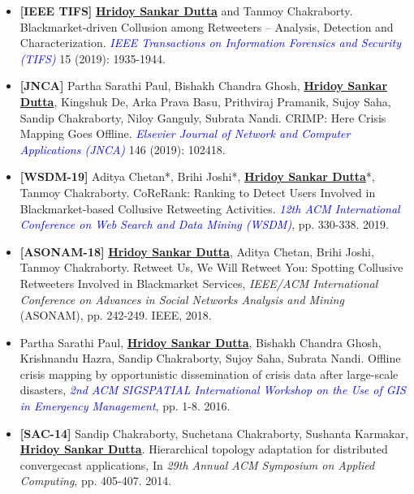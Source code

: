 \documentclass[margin, centered,lmodern]{res}
\begin{document}
\begin{resume}
\begin{itemize}[leftmargin=*]
\item  \textbf{[IEEE TIFS]} \textbf{\underline{Hridoy Sankar Dutta}} and Tanmoy Chakraborty. Blackmarket-driven Collusion among Retweeters – Analysis, Detection and Characterization. \textit{\textcolor{blue}{IEEE Transactions on Information Forensics and Security (TIFS)}} 15 (2019): 1935-1944.

\item  \textbf{[JNCA]} Partha Sarathi Paul, Bishakh Chandra Ghosh, \textbf{\underline{Hridoy Sankar Dutta}}, Kingshuk De, Arka Prava Basu, Prithviraj Pramanik, Sujoy Saha, Sandip Chakraborty, Niloy Ganguly, Subrata Nandi. CRIMP: Here Crisis Mapping Goes Offline. \textit{\textcolor{blue}{Elsevier Journal of Network and Computer Applications (JNCA)}} 146 (2019): 102418.

\item   \textbf{[WSDM-19]} Aditya Chetan*, Brihi Joshi*, \textbf{\underline{Hridoy Sankar Dutta}}*, Tanmoy Chakraborty. CoReRank: Ranking to Detect Users Involved in Blackmarket-based Collusive Retweeting Activities. \textit{\textcolor{blue}{12th ACM International Conference on Web Search and Data Mining (WSDM)}}, pp. 330-338. 2019.


\item  \textbf{[ASONAM-18]} \textbf{\underline{Hridoy Sankar Dutta}}, Aditya Chetan, Brihi Joshi, Tanmoy Chakraborty. Retweet Us, We Will Retweet You: Spotting Collusive Retweeters Involved in Blackmarket Services, \textit{IEEE/ACM International Conference on Advances in Social Networks Analysis and Mining} (ASONAM), pp. 242-249. IEEE, 2018.

\item Partha Sarathi Paul, \textbf{\underline{Hridoy Sankar Dutta}}, Bishakh Chandra Ghosh, Krishnandu Hazra, Sandip Chakraborty, Sujoy Saha, Subrata Nandi. Offline crisis mapping by opportunistic dissemination of crisis data after large-scale disasters, \textit{\textcolor{blue}{2nd ACM SIGSPATIAL International Workshop on the Use of GIS in Emergency Management}}, pp. 1-8. 2016.

\item  \textbf{[SAC-14]} Sandip Chakraborty, Suchetana Chakraborty, Sushanta Karmakar, \textbf{\underline{Hridoy Sankar Dutta}}. Hierarchical topology adaptation for distributed convergecast applications, In \textit{29th Annual ACM Symposium on Applied Computing}, pp. 405-407. 2014.\end{itemize}



\end{resume}
\end{document}
